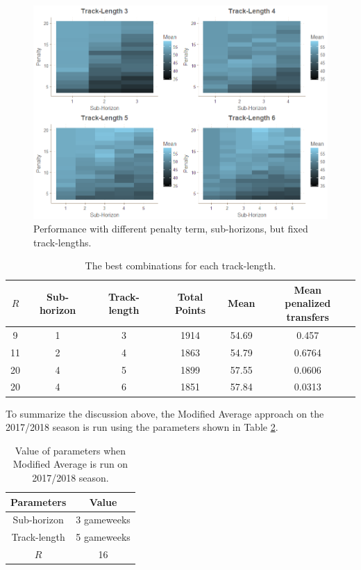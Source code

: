 \begin{figure}[H]
    \centering
    \includegraphics[scale=0.55]{fig/chapter_6/paramter_choice_fixed_f_hor.png}
    \caption{Performance with different penalty term, sub-horizons, but fixed track-lengths.}
\label{fig:fixed_f_hor}    
\end{figure}

\begin{table}[H]
\centering
\begin{tabular}{|c|c|c|c|c|c|}
\hline
$R$ & Sub-horizon & Track-length & Total Points & Mean & \makecell{Mean \\ penalized transfers}  \\
\hline
9       & 1       & 3                & 1914         & 54.69     & 0.457  \\
11      & 2       & 4                & 1863         & 54.79     & 0.6764 \\
20      & 4       & 5                & 1899         & 57.55     & 0.0606 \\
20      & 4       & 6                & 1851         & 57.84     & 0.0313 \\
\hline
\end{tabular}
\caption{The best combinations for each track-length.}
\label{tab:top_5}
\end{table}


\newpar
To summarize the discussion above, the Modified Average approach on the 2017/2018 season is run using the parameters shown in Table \ref{tab:final_parameters_ma}.

\begin{table}[H]
\centering
\begin{tabular}{|c|c|}
    \hline
    Parameters      &  Value \\
    \hline
    Sub-horizon     &   3 gameweeks \\
    Track-length    &   5 gameweeks \\ 
    $R$             &   16 \\ 
    \hline
\end{tabular}
\caption{Value of parameters when Modified Average is run on 2017/2018 season.}
\label{tab:final_parameters_ma}
\end{table}

